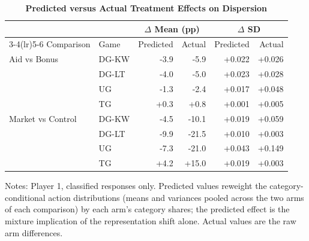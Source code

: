 \begin{table}[!htbp]
\centering
\small
\renewcommand{\arraystretch}{1.15}
\caption{\textbf{Predicted versus Actual Treatment Effects on Dispersion}}
\label{tab:heterogeneity_predicted_actual}
\begin{tabular}{ll rr rr}
\toprule
 & & \multicolumn{2}{c}{$\Delta$ Mean (pp)} & \multicolumn{2}{c}{$\Delta$ SD} \\
\cmidrule(lr){3-4}\cmidrule(lr){5-6}
Comparison & Game & Predicted & Actual & Predicted & Actual \\
\midrule
Aid vs Bonus & DG-KW & -3.9 & -5.9 & +0.022 & +0.026 \\
 & DG-LT & -4.0 & -5.0 & +0.023 & +0.028 \\
 & UG & -1.3 & -2.4 & +0.017 & +0.048 \\
 & TG & +0.3 & +0.8 & +0.001 & +0.005 \\
\midrule
Market vs Control & DG-KW & -4.5 & -10.1 & +0.019 & +0.059 \\
 & DG-LT & -9.9 & -21.5 & +0.010 & +0.003 \\
 & UG & -7.3 & -21.0 & +0.043 & +0.149 \\
 & TG & +4.2 & +15.0 & +0.019 & +0.003 \\
\bottomrule
\end{tabular}
\begin{flushleft}
\footnotesize Notes: Player 1, classified responses only. Predicted values reweight the category-conditional action distributions (means and variances pooled across the two arms of each comparison) by each arm's category shares; the predicted effect is the mixture implication of the representation shift alone. Actual values are the raw arm differences.
\end{flushleft}
\end{table}
